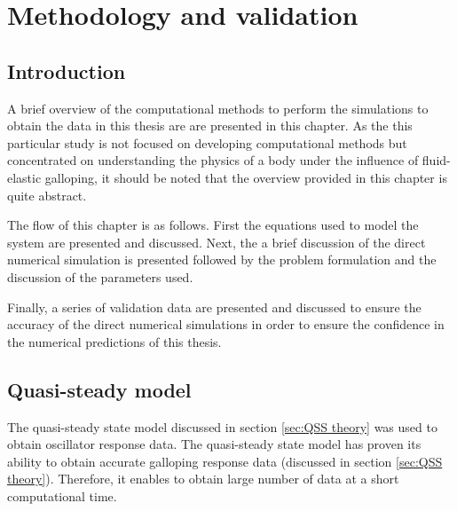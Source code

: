 \chapter{Methodology and validation}

\section{Introduction}
 
A brief overview of the computational methods to perform the simulations to obtain the data in this thesis are are presented in this chapter. As the this particular study is not focused on developing computational methods but concentrated on understanding the physics of a body under the influence of fluid-elastic galloping, it should be noted that the overview provided in this chapter is quite abstract.

The flow of this chapter is as follows. First the equations used to model the system are presented and discussed. Next, the a brief discussion of the direct numerical simulation is presented followed by the problem formulation and the discussion of the parameters used. 

Finally, a series of validation data are presented and discussed to ensure the accuracy of the direct numerical simulations in order to ensure the confidence in the numerical predictions of this thesis.

\section{Quasi-steady model}
\label{sec:QSS_model_methodology}

The quasi-steady state model discussed in section \ref{sec:QSS theory} was used to obtain oscillator response data. The quasi-steady state model has proven its ability to obtain accurate galloping response data (discussed in section \ref{sec:QSS theory}). Therefore, it enables to obtain large number of data at a short computational time. 















